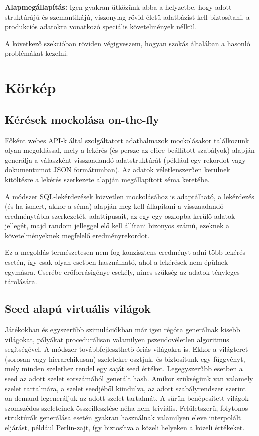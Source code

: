 \documentclass[
    parspace,
    noindent,
    nohyp,
]{elteiktdk}[2023/04/10]
\newcommand{\thesispar}[1]{
\vspace{1em}
\hspace{0.7cm}\parbox[left][][c]{15.8cm}{\linespread{1.2}\selectfont #1}
\vspace{1em}
}
\begin{document}
\thesispar{
    \textbf{Alapmegállapítás:} Igen gyakran ütközünk abba a helyzetbe,
    hogy adott struktúrájú és szemantikájú, viszonylag rövid életű adatbázist kell biztosítani,
    a produkciós adatokra vonatkozó speciális követelmények nélkül.
}

A következő szekcióban röviden végigveszem, hogyan szokás általában a hasonló problémákat kezelni.


\section{Körkép}

\subsection{Kérések mockolása on-the-fly}

Főként webes API-k által szolgáltatott adathalmazok mockolásakor találkozunk olyan megoldással,
mely a lekérés (és persze az előre beállított szabályok)
alapján generálja a válaszként visszaadandó adatstruktúrát
(például egy rekordot vagy dokumentumot JSON formátumban).
Az adatok véletlenszerűen kerülnek kitöltésre a lekérés szerkezete alapján megállapított séma keretébe.

A módszer SQL-lekérdezések közvetlen mockolásához is adaptálható,
a lekérdezés (és ha ismert, akkor a séma) alapján meg kell állapítani
a visszaadandó eredménytábla szerkezetét, adattípusait,
az egy-egy oszlopba kerülő adatok jellegét,
majd random jelleggel elő kell állítani bizonyos számú, ezeknek a követelményeknek megfelelő eredményrekordot.

Ez a megoldás természetesen nem fog konzisztens eredményt adni több lekérés esetén,
így csak olyan esetben használható, ahol a lekérések nem épülnek egymásra.
Cserébe erőforrásigénye csekély, nincs szükség az adatok tényleges tárolására.

\subsection{Seed alapú virtuális világok}

Játékokban és egyszerűbb szimulációkban már igen régóta generálnak kisebb világokat,
pályákat procedurálisan valamilyen pszeudovéletlen algoritmus segítségével.
A módszer továbbfejleszthető óriás világokra is.
Ekkor a világteret (sorosan vagy hierarchikusan) szeletekre osztjuk, és biztosítunk egy függvényt,
mely minden szelethez rendel egy saját seed értéket.
Legegyszerűbb esetben a seed az adott szelet sorszámából generált hash.
Amikor szükségünk van valamely szelet tartalmára, a szelet seedjéből kiindulva,
az adott szabályrendszer szerint on-demand legeneráljuk az adott szelet tartalmát.
A sűrűn benépesített világok szomszédos szeleteinek összeillesztése néha nem triviális.
Felületszerű, folytonos struktúrák generálása esetén gyakran használnak
valamilyen eleve interpolált eljárást, például Perlin-zajt,
így biztosítva a közeli helyeken a közeli értékeket.
\end{document}

